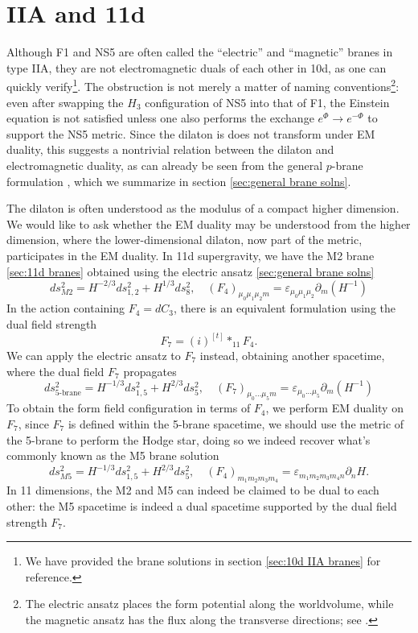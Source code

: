 \section{IIA and 11d}

Although F1 and NS5 are often called the ``electric'' and ``magnetic'' branes in type IIA, they are not electromagnetic duals of each other in 10d, as one can quickly verify\footnote{We have provided the brane solutions in section \ref{sec:10d IIA branes} for reference.}.
The obstruction is not merely a matter of naming conventions\footnote{The electric ansatz places the form potential along the worldvolume, while the magnetic ansatz has the flux along the transverse directions; see \cite{Stelle:1998xg}.}: even after swapping the $H_3$ configuration of NS5 into that of F1, the Einstein equation is not satisfied unless one also performs the exchange $e^{\Phi} \to e^{-\Phi}$ to support the NS5 metric.
Since the dilaton is does not transform under EM duality, this suggests a nontrivial relation between the dilaton and electromagnetic duality, as can already be seen from the general $p$-brane formulation \cite{Stelle:1998xg}, which we summarize in section \ref{sec:general brane solns}.

The dilaton is often understood as the modulus of a compact higher dimension.
We would like to ask whether the EM duality may be understood from the higher dimension, where the lower-dimensional dilaton, now part of the metric, participates in the EM duality.
In 11d supergravity, we have the M2 brane \ref{sec:11d branes} obtained using the electric ansatz \ref{sec:general brane solns}
\begin{equation}
ds^2_{M2} = H^{-2/3}ds_{1,2}^2 + H^{1/3}ds_8^2,\quad
(F_4)_{\mu_0 \mu_1 \mu_2 m} = \varepsilon_{\mu_0 \mu_1 \mu_2}\partial_m(H^{-1})
\label{M2-brane}
\end{equation}
In the action containing $F_4 = dC_3$, there is an equivalent formulation using the dual field strength 
\begin{equation}
F_7 = (i)^{[t]}*_{11} F_4.
\end{equation}
We can apply the electric ansatz to $F_7$ instead, obtaining another spacetime, where the dual field $F_7$ propagates
\begin{equation}
ds^2_{\text{5-brane}} = H^{-1/3}ds_{1,5}^2 + H^{2/3}ds_5^2,\quad
(F_7)_{\mu_0 ... \mu_5 m} = \varepsilon_{\mu_0 ... \mu_5}\partial_m(H^{-1})
\label{M2-brane dual}
\end{equation}
To obtain the form field configuration in terms of $F_4$, we perform EM duality on $F_7$, since $F_7$ is defined within the 5-brane spacetime, we should use the metric of the 5-brane to perform the Hodge star, doing so we indeed recover what's commonly known as the M5 brane solution
\begin{equation}
ds^2_{M5} = H^{-1/3}ds_{1,5}^2 + H^{2/3}ds_5^2,\quad
(F_4)_{m_1 m_2 m_3 m_4} = \varepsilon_{m_1 m_2 m_3 m_4 n} \partial_n H.
\label{M5-brane}
\end{equation}
In 11 dimensions, the M2 and M5 can indeed be claimed to be dual to each other: the M5 spacetime is indeed a dual spacetime supported by the dual field strength $F_7$.

